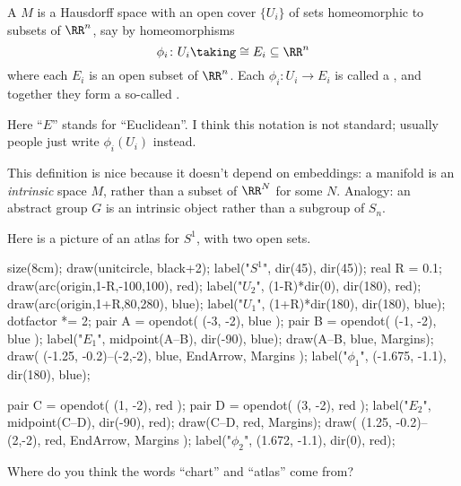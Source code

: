 \begin{definition}
	\label{def:topological_manif}
	A  $M$ is a Hausdorff space
	with an open cover $\{U_i\}$ of sets
	homeomorphic to subsets of $\RR^n$,
	say by homeomorphisms
	\[ \phi_i \colon U_i \taking\cong E_i \subseteq \RR^n \]
	where each $E_i$ is an open subset of $\RR^n$.
	Each $\phi_i \colon U_i \to E_i$ is called a ,
	and together they form a so-called .
\end{definition}
\begin{remark}
	Here ``$E$'' stands for ``Euclidean''.
	I think this notation is not standard; usually
	people just write $\phi_i(U_i)$ instead.
\end{remark}
\begin{remark}
	This definition is nice because it doesn't depend on embeddings:
	a manifold is an \emph{intrinsic} space $M$,
	rather than a subset of $\RR^N$ for some $N$.
	Analogy: an abstract group $G$ is an intrinsic object
	rather than a subgroup of $S_n$.
\end{remark}

\begin{example}[An atlas on $S^1$]
Here is a picture of an atlas for $S^1$, with two open sets.
\begin{center}
	\begin{asy}
		size(8cm);
		draw(unitcircle, black+2);
		label("$S^1$", dir(45), dir(45));
		real R = 0.1;
		draw(arc(origin,1-R,-100,100), red);
		label("$U_2$", (1-R)*dir(0), dir(180), red);
		draw(arc(origin,1+R,80,280), blue);
		label("$U_1$", (1+R)*dir(180), dir(180), blue);
		dotfactor *= 2;
		pair A = opendot( (-3, -2), blue );
		pair B = opendot( (-1, -2), blue );
		label("$E_1$", midpoint(A--B), dir(-90), blue);
		draw(A--B, blue, Margins);
		draw( (-1.25, -0.2)--(-2,-2), blue, EndArrow, Margins );
		label("$\phi_1$", (-1.675, -1.1), dir(180), blue);

		pair C = opendot( (1, -2), red );
		pair D = opendot( (3, -2), red );
		label("$E_2$", midpoint(C--D), dir(-90), red);
		draw(C--D, red, Margins);
		draw( (1.25, -0.2)--(2,-2), red, EndArrow, Margins );
		label("$\phi_2$", (1.672, -1.1), dir(0), red);
	\end{asy}
\end{center}
\end{example}

\begin{ques}
	Where do you think the words ``chart'' and ``atlas'' come from?
\end{ques}

